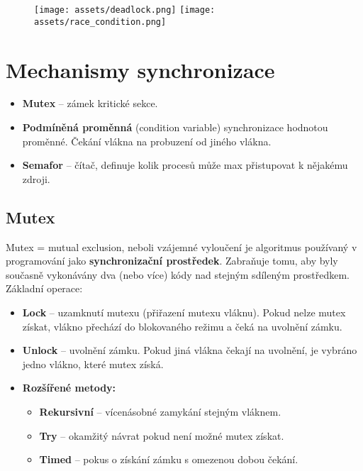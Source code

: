 \begin{figure}[H]
    \centering
    \texttt{[image: assets/deadlock.png]}
    \texttt{[image: assets/race\_condition.png]}
\end{figure}

\section{Mechanismy synchronizace}
\begin{itemize}
    \item \textbf{Mutex} -- zámek kritické sekce.
    \item \textbf{Podmíněná proměnná} (condition variable) synchronizace hodnotou proměnné. Čekání vlákna na probuzení od jiného vlákna.
    \item \textbf{Semafor} --  čítač, definuje kolik procesů může max přistupovat k nějakému zdroji.
\end{itemize}

\subsection{Mutex}
Mutex = mutual exclusion, neboli vzájemné vyloučení je algoritmus používaný v programování jako \textbf{synchronizační prostředek}. Zabraňuje tomu, aby byly současně vykonávány dva (nebo více) kódy nad stejným sdíleným prostředkem. Základní operace:
\begin{itemize}
    \item \textbf{Lock} -- uzamknutí mutexu (přiřazení mutexu vláknu). Pokud nelze mutex získat, vlákno přechází do blokovaného režimu a čeká na uvolnění zámku.
    \item \textbf{Unlock} -- uvolnění zámku. Pokud jiná vlákna čekají na uvolnění, je vybráno jedno vlákno, které mutex získá.
    \item \textbf{Rozšířené metody:}
          \begin{itemize}
              \item \textbf{Rekursivní} -- vícenásobné zamykání stejným vláknem.
              \item \textbf{Try} -- okamžitý návrat pokud není možné mutex získat.
              \item \textbf{Timed} -- pokus o získání zámku s omezenou dobou čekání.
          \end{itemize}
\end{itemize}

